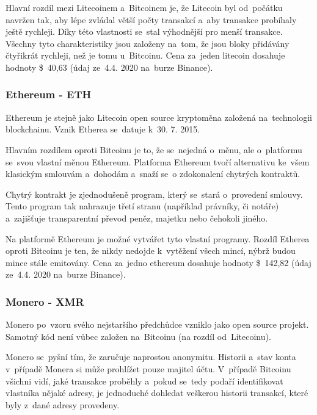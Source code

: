 \documentclass[thesis=B,czech]{FITthesis}[2019/03/21]
\begin{document}
Hlavní rozdíl mezi Litecoinem a~Bitcoinem je, že Litecoin byl od~počátku navržen tak, aby lépe zvládal větší počty transakcí a~aby transakce probíhaly ještě rychleji. Díky této vlastnosti se~stal výhodnější pro menší transakce. Všechny tyto charakteristiky jsou založeny na~tom, že jsou bloky přidávány čtyřikrát rychleji, než je tomu u~Bitcoinu. \cite{litecoin} Cena za~jeden litecoin dosahuje hodnoty \$~40,63 (údaj ze~4.4. 2020 na~burze Binance). \cite{binance_markets}

\subsubsection{Ethereum - ETH}
Ethereum je stejně jako Litecoin open source kryptoměna založená na~technologii blockchainu. Vznik Etherea se~datuje k~30. 7. 2015. 

Hlavním rozdílem oproti Bitcoinu je to, že se~nejedná o~měnu, ale o~platformu se~svou vlastní měnou Ethereum. Platforma Ethereum tvoří alternativu ke~všem klasickým smlouvám a~dohodám a~snaží se~o zdokonalení chytrých kontraktů. \cite{btc_vs_eth}

Chytrý kontrakt je zjednodušeně program, který se~stará o~provedení smlouvy. Tento program tak nahrazuje třetí stranu (například právníky, či notáře) a~zajišťuje transparentní převod peněz, majetku nebo čehokoli \linebreak jiného. \cite{ethereum}

Na platformě Ethereum je možné vytvářet tyto vlastní programy. \cite{ethereum} Rozdíl Etherea oproti Bitcoinu je ten, že nikdy nedojde k~vytěžení všech mincí, nýbrž budou mince stále emitovány. \cite{alza_monero} Cena za~jedno ethereum dosahuje hodnoty  \$~142,82 (údaj ze~4.4. 2020 na~burze Binance). \cite{binance_markets}

\subsubsection{Monero - XMR}
Monero po~vzoru svého nejstaršího předchůdce vzniklo jako open source projekt. Samotný kód není vůbec založen na~Bitcoinu (na rozdíl od~Litecoinu). 

Monero se~pyšní tím, že zaručuje naprostou anonymitu. Historii a~stav konta v~případě Monera si může prohlížet pouze majitel účtu. V~případě Bitcoinu všichni vidí, jaké transakce proběhly a~pokud se~tedy podaří identifikovat vlastníka nějaké adresy, je jednoduché dohledat veškerou historii transakcí, které byly z~dané adresy provedeny.
\end{document}
